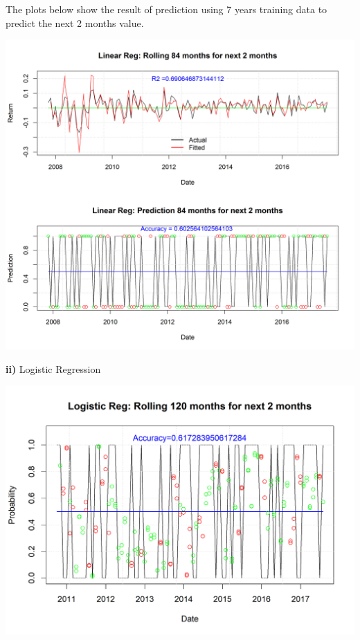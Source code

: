 \documentclass[12pt]{amsart}
\begin{document}
The plots below show the result of prediction using 7 years training data to predict the next 2 months value.
\begin{center}
	\includegraphics[scale=0.8]{IYW_linear_reg_rolling}
\end{center}


\textbf{ii)} Logistic Regression\\

\begin{center}
	\includegraphics[scale=0.9]{IYW_logistic_reg_rolling}
\end{center}
\end{document}

